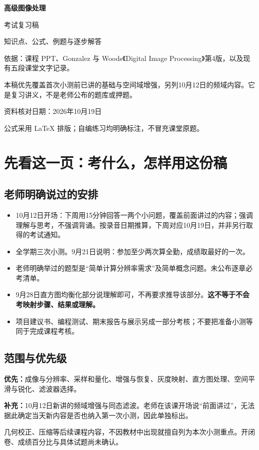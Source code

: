 \begin{titlepage}
\vspace*{1.5cm}
{\Huge\bfseries 高级图像处理\par}
\vspace{.5cm}
{\LARGE 考试复习稿\par}
\vspace{.5cm}
{\large 知识点、公式、例题与逐步解答\par}
\vspace{1.2cm}
\noindent 依据：课程 PPT、Gonzalez 与 Woods《Digital Image Processing》第4版，以及现有五段课堂文字记录。\par
\vspace{.6cm}
\noindent 本稿优先覆盖首次小测前已讲的基础与空间域增强，另列10月12日的频域内容。它是复习讲义，不是老师公布的题库或押题。\par
\vfill
\noindent 资料核对日期：2026年10月19日\par
\noindent 公式采用 LaTeX 排版；自编练习均明确标注，不冒充课堂原题。\par
\end{titlepage}
\section*{先看这一页：考什么，怎样用这份稿}
\subsection*{老师明确说过的安排}
\begin{itemize}
\item 10月12日开场：下周用15分钟回答一两个小问题，覆盖前面讲过的内容；强调理解与思考，不强调背诵。按录音日期推算，下周对应10月19日，并非另行取得的考试通知。
\item 全学期三次小测。9月21日说明：参加至少两次算全勤，成绩取最好的一次。
\item 老师明确举过的题型是“简单计算分辨率需求”及简单概念问题。未公布逐章必考清单。
\item 9月28日直方图均衡化部分说理解即可，不再要求推导该部分。\textbf{这不等于不会考映射步骤、结果或理解。}
\item 项目建议书、编程测试、期末报告与展示另成一部分考核；不要把准备小测等同于完成课程考核。
\end{itemize}
\subsection*{范围与优先级}
\textbf{优先：}成像与分辨率、采样和量化、增强与恢复、灰度映射、直方图处理、空间平滑与锐化、滤波器选择。\par
\textbf{补充：}10月12日新讲的频域增强与同态滤波。老师在该课开场说“前面讲过”，无法据此确定当天新内容是否也纳入第一次小测，因此单独标出。\par
几何校正、压缩等后续课程内容，不因教材中出现就擅自列为本次小测重点。开闭卷、成绩百分比与具体试题尚未确认。
